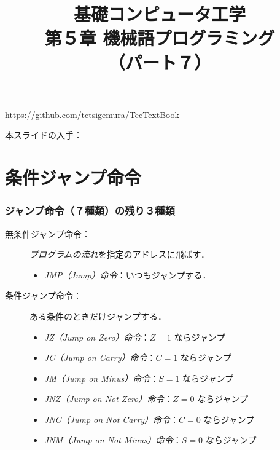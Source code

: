 \documentclass[handout]{beamer}        %
\begin{document}
\title{基礎コンピュータ工学\\第５章 機械語プログラミング\\（パート７）}
\date{}

\begin{frame}
  \titlepage
  \centerline{\url{https://github.com/tctsigemura/TecTextBook}}
  \vfill
  \centerline{本スライドの入手：
    }
\end{frame}


\section{条件ジャンプ命令}
\begin{frame}
  \frametitle{ジャンプ命令（７種類）の残り３種類}
  \begin{description}
  \item[無条件ジャンプ命令：]\emph{プログラムの流れ}を指定のアドレスに飛ばす．
    \begin{itemize}
      \item \emph{JMP（Jump）命令}：いつもジャンプする．
    \end{itemize}
    \vfill
  \item[条件ジャンプ命令：]ある条件のときだけジャンプする．
    \begin{itemize}
      \item \emph{JZ（Jump on Zero）命令}：$Z=1$ ならジャンプ
        \vfill
      \item \emph{JC（Jump on Carry）命令}：$C=1$ ならジャンプ
        \vfill
      \item \emph{JM（Jump on Minus）命令}：$S=1$ ならジャンプ
        \vfill
      \item \emph{JNZ（Jump on Not Zero）命令}：$Z=0$ ならジャンプ
        \vfill
      \item \emph{JNC（Jump on Not Carry）命令}：$C=0$ ならジャンプ
        \vfill
      \item \emph{JNM（Jump on Not Minus）命令}：$S=0$ ならジャンプ
    \end{itemize}
  \end{description}
  \vfill
\end{frame}
\end{document}
